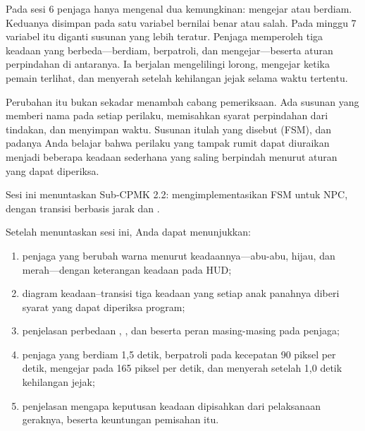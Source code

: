 

Pada sesi 6 penjaga hanya mengenal dua kemungkinan: mengejar atau berdiam.
Keduanya disimpan pada satu variabel bernilai benar atau salah. Pada minggu 7
variabel itu diganti susunan yang lebih teratur. Penjaga memperoleh tiga
keadaan yang berbeda---berdiam, berpatroli, dan mengejar---beserta aturan
perpindahan di antaranya. Ia berjalan mengelilingi lorong, mengejar ketika
pemain terlihat, dan menyerah setelah kehilangan jejak selama waktu tertentu.

Perubahan itu bukan sekadar menambah cabang pemeriksaan. Ada susunan yang
memberi nama pada setiap perilaku, memisahkan syarat perpindahan dari tindakan,
dan menyimpan waktu. Susunan itulah yang disebut 
(FSM), dan padanya Anda belajar bahwa perilaku yang tampak rumit dapat diuraikan
menjadi beberapa keadaan sederhana yang saling berpindah menurut aturan yang
dapat diperiksa.

Sesi ini menuntaskan Sub-CPMK 2.2: mengimplementasikan FSM untuk NPC, dengan
transisi berbasis jarak dan .


\begin{tujuanbox}
Setelah menuntaskan sesi ini, Anda dapat menunjukkan:
\begin{enumerate}[leftmargin=1.5em, itemsep=0.2em]
  \item penjaga yang berubah warna menurut keadaannya---abu-abu, hijau, dan
        merah---dengan keterangan keadaan pada HUD;
  \item diagram keadaan--transisi tiga keadaan yang setiap anak panahnya diberi
        syarat yang dapat diperiksa program;
  \item penjelasan perbedaan , , dan
         beserta peran masing-masing pada penjaga;
  \item penjaga yang berdiam 1,5 detik, berpatroli pada kecepatan 90 piksel per
        detik, mengejar pada 165 piksel per detik, dan menyerah setelah
        1,0 detik kehilangan jejak;
  \item penjelasan mengapa keputusan keadaan dipisahkan dari pelaksanaan
        geraknya, beserta keuntungan pemisahan itu.
\end{enumerate}
\end{tujuanbox}

